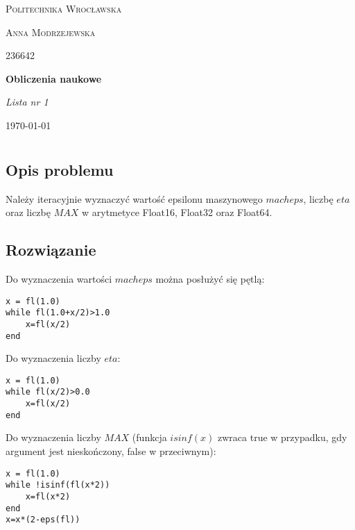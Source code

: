\documentclass[11pt]{article}
\theoremstyle{remark}
\begin{document}
\begin{titlepage}
	\centering
	
	{\scshape\LARGE Politechnika Wrocławska \par}
	\vspace{1cm}
	{\scshape\Large Anna Modrzejewska\par}
		{\scshape\Large 236642\par}

	\vspace{1.5cm}
	{\huge\bfseries Obliczenia naukowe\par}
	\vspace{0.5cm}
	{\Large\itshape Lista nr 1\par}
	\vfill

	{\large \today\par}
\end{titlepage}

\newpage
{}
\section{}
\subsection{Opis problemu}
Należy iteracyjnie wyznaczyć wartość epsilonu maszynowego $macheps$, liczbę $eta$ oraz liczbę $MAX$ w arytmetyce Float16, Float32 oraz Float64.
\subsection{Rozwiązanie}
Do wyznaczenia wartości $macheps$ można posłużyć się pętlą:
\begin{lstlisting}[style=JuliaStyle]
x = fl(1.0)
while fl(1.0+x/2)>1.0
	x=fl(x/2)
end
\end{lstlisting}
Do wyznaczenia liczby $eta$:
\begin{lstlisting}[style=JuliaStyle]
x = fl(1.0)
while fl(x/2)>0.0
	x=fl(x/2)
end
\end{lstlisting}
Do wyznaczenia liczby $MAX$ (funkcja $isinf(x)$ zwraca true w przypadku, gdy argument jest nieskończony, false w przeciwnym):
\begin{lstlisting}[style=JuliaStyle]
x = fl(1.0)
while !isinf(fl(x*2))
	x=fl(x*2)
end
x=x*(2-eps(fl))
\end{lstlisting}
\end{document}
